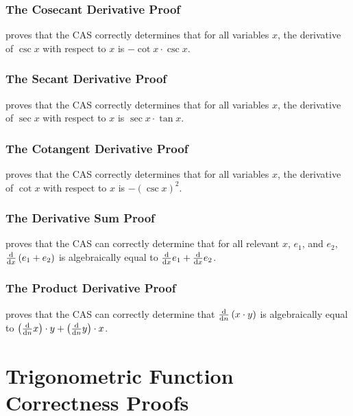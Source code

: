 \documentclass{report}
\begin{document}
\subsubsection{The Cosecant Derivative Proof}
  proves that the  CAS correctly determines that for all variables \(x\), the derivative of \(\csc x\) with respect to \(x\) is \(- \cot x \cdot \csc x\).

\subsubsection{The Secant Derivative Proof}
  proves that the  CAS correctly determines that for all variables \(x\), the derivative of \(\sec x\) with respect to \(x\) is \(\sec x \cdot \tan x\).

\subsubsection{The Cotangent Derivative Proof}
  proves that the  CAS correctly determines that for all variables \(x\), the derivative of \(\cot x\) with respect to \(x\) is \(- \left(\csc x\right)^2\).

\subsubsection{The Derivative Sum Proof}
  proves that the  CAS can correctly determine that for all relevant \(x\), \(e_1\), and \(e_2\), \(\derivative{x} \left(e_1 + e_2\right)\) is algebraically equal to \(\derivative{x} e_1 + \derivative{x} e_2\).

\subsubsection{The Product Derivative Proof}
  proves that the  CAS can correctly determine that \(\derivative{n} \left(x \cdot y\right)\) is algebraically equal to \(\left(\derivative{n} x\right) \cdot y + \left(\derivative{n} y\right) \cdot x\).

\section{Trigonometric Function Correctness Proofs}
\end{document}
